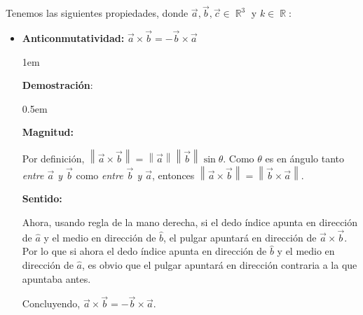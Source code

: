 \documentclass[12pt, fleqn]{report}                             %
\newenvironment{SmallIndentation}[1][0.75em]                    %
        {\begin{adjustwidth}{#1}{}\begin{footnotesize}}             %
        {\end{footnotesize}\end{adjustwidth}}                       %
\theoremstyle{break}                                            %
\DeclareMathOperator \Reals        {\mathbb{R}}                 %
\newcommand{\Abs}[1]    {\left\lVert #1 \right\lVert}           %
\begin{document}
                Tenemos las siguientes propiedades, donde $\vec{a}, \vec{b}, \vec{c} \in \Reals^3$ y $k \in \Reals$:
                \begin{itemize}

                    \item
                        \textbf{Anticonmutatividad:}
                            $\vec{a} \times \vec{b} = -\vec{b} \times \vec{a}$

                            \begin{SmallIndentation}[1em]
                                \textbf{Demostración}:

                                \begin{SmallIndentation}[0.5em]
                                    
                                    \textbf{Magnitud:}

                                    Por definición, $\Abs{\vec{a} \times \vec{b}} = \Abs{\vec{a}} \Abs{\vec{b}} \sin \theta$.
                                    Como $\theta$ es en ángulo tanto \emph{entre $\vec{a}$ y $\vec{b}$} como 
                                    \emph{entre $\vec{b}$ y $\vec{a}$}, entonces 
                                    $\Abs{\vec{a} \times \vec{b}} = \Abs{\vec{b} \times \vec{a}}$.
                            
                                    \textbf{Sentido:}

                                    Ahora, usando regla de la mano derecha, si el dedo índice apunta en dirección
                                    de $\hat{a}$ y el medio en dirección de $\hat{b}$, el pulgar apuntará en dirección
                                    de $\vec{a} \times \vec{b}$.
                                    Por lo que si ahora el dedo índice apunta en dirección de $\hat{b}$ y el medio en
                                    dirección de $\hat{a}$, es obvio que el pulgar apuntará en dirección contraria a la
                                    que apuntaba antes.
                                
                                \end{SmallIndentation}
                        
                                Concluyendo, $\vec{a} \times \vec{b} = -\vec{b} \times \vec{a}$.
                            
                            \end{SmallIndentation}
                                

\end{itemize}
\end{document}
